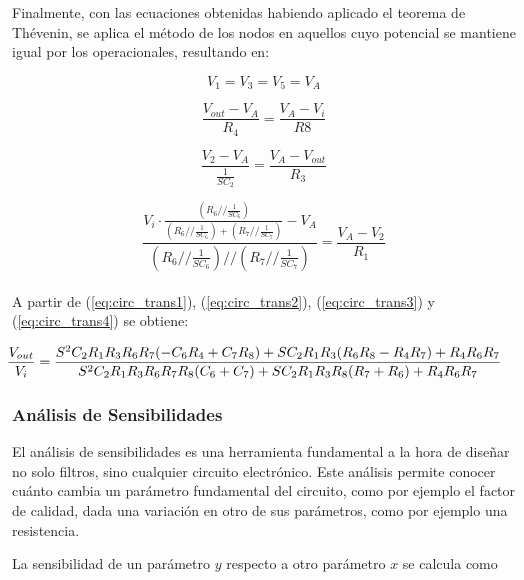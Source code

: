 Finalmente, con las ecuaciones obtenidas habiendo aplicado el teorema de Thévenin, se aplica el método de los nodos en aquellos cuyo potencial se mantiene igual por los operacionales, resultando en:

\begin{equation}
V_1=V_3=V_5=V_A
\label{eq:circ_trans1}
\end{equation}

\begin{equation}
\frac{V_{out} - V_A}{R_4} = \frac{V_A-V_i}{R8}
\label{eq:circ_trans2}
\end{equation}

\begin{equation}
\frac{V_2 - V_A}{\frac{1}{SC_2}} = \frac{V_A-V_{out}}{R_3}
\label{eq:circ_trans3}
\end{equation}

\begin{equation}
\frac{V_i \cdot \frac{\left(R_6 // \frac{1}{SC_6}\right)}{\left(R_6 // \frac{1}{SC_6}\right) + \left(R_7 // \frac{1}{SC_7}\right)} - V_A}{\left(R_6 // \frac{1}{SC_6}\right) // \left(R_7 // \frac{1}{SC_7}\right)} = \frac{V_A-V_2}{R_1}
\label{eq:circ_trans4}
\end{equation} \\

A partir de (\ref{eq:circ_trans1}), (\ref{eq:circ_trans2}), (\ref{eq:circ_trans3}) y (\ref{eq:circ_trans4}) se obtiene:

\begin{equation}
\hspace{-0.5cm}
\frac{V_{out}}{V_i} = \frac{S^2 C_2 R_1 R_3 R_6 R_7 (-C_6 R_4 + C_7 R_8) + S C_2 R_1 R_3 (R_6 R_8 - R_4 R_7) + R_4 R_6 R_7}{S^2 C_2 R_1 R_3 R_6 R_7 R_8 (C_6 + C_7)+S C_2 R_1 R_3 R_8 (R_7 + R_6) + R_4 R_6 R_7}
\label{circ_trans}
\end{equation}

\subsubsection{Análisis de Sensibilidades}
\label{sec:sens}

El análisis de sensibilidades es una herramienta fundamental a la hora de diseñar no solo filtros, sino cualquier circuito electrónico. Este análisis permite conocer cuánto cambia un parámetro fundamental del circuito, como por ejemplo el factor de calidad, dada una variación en otro de sus parámetros, como por ejemplo una resistencia.

La sensibilidad de un parámetro $y$ respecto a otro parámetro $x$ se calcula como

